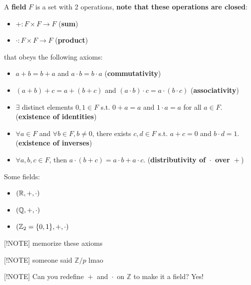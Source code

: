 \documentclass[12pt]{article}
\begin{document}
\begin{defn}
    A \textbf{field} $F$ is a set with 2 operations, \textbf{note that these operations are closed}:
    \begin{itemize}
        \item ${}+: F\times F \to F{}$ (\textbf{sum})
        \item ${}\cdot: F\times F \to F{}$ (\textbf{product})
    \end{itemize}
    that obeys the following axioms:
    \begin{itemize}
        \item[(F1)] ${}a+b=b+a{}$ and ${}a \cdot b = b \cdot a{}$ (\textbf{commutativity})
        \item[(F2)] ${}(a+b)+c=a+(b+c){}$ and ${}(a \cdot b) \cdot c = a \cdot (b \cdot c){}$ (\textbf{associativity})
        \item[(F3)] ${}\exists{}$ distinct elements ${}0,1 \in F{}$ s.t. ${}0 + a =a{}$ and ${}1 \cdot a = a{}$ for all ${}a\in F{}$. (\textbf{existence of identities})
        \item[(F4)] ${}\forall a \in F{}$ and ${}\forall b \in F, b \neq 0{}$, there exists ${}c,d \in F{}$ s.t. ${}a+c=0{}$ and ${}b \cdot d = 1{}$. (\textbf{existence of inverses})
        \item[(F5)] ${}\forall a,b,c \in F{}$, then ${}a \cdot (b + c) = a \cdot b + a\cdot c{}$. (\textbf{distributivity of ${}\cdot{}$ over ${}+{}$})
    \end{itemize}
\end{defn}
\begin{ex}
    Some fields:
    \begin{itemize}
        \item $(\mathbb{R}, +, \cdot)$
        \item $(\mathbb{Q}, +, \cdot)$
        \item $(\mathbb{Z}_{2} = \{ 0,1 \}, +, \cdot)$
    \end{itemize}
\end{ex}

[!NOTE] memorize these axioms

[!NOTE] someone said ${}\mathbb{Z}/p{}$ lmao

[!NOTE] Can you redefine ${}+{}$ and ${}\cdot{}$ on ${}\mathbb{Z}{}$ to make it a field? Yes!
\end{document}
